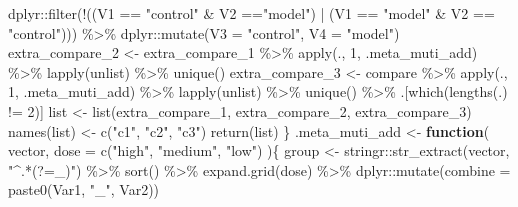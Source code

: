 \documentclass[
]{article}
\newenvironment{Shaded}{\begin{snugshade}}{\end{snugshade}}
\newcommand{\AttributeTok}[1]{\textcolor[rgb]{0.77,0.63,0.00}{#1}}
\newcommand{\ControlFlowTok}[1]{\textcolor[rgb]{0.13,0.29,0.53}{\textbf{#1}}}
\newcommand{\DecValTok}[1]{\textcolor[rgb]{0.00,0.00,0.81}{#1}}
\newcommand{\FunctionTok}[1]{\textcolor[rgb]{0.00,0.00,0.00}{#1}}
\newcommand{\NormalTok}[1]{#1}
\newcommand{\OtherTok}[1]{\textcolor[rgb]{0.56,0.35,0.01}{#1}}
\newcommand{\SpecialCharTok}[1]{\textcolor[rgb]{0.00,0.00,0.00}{#1}}
\newcommand{\StringTok}[1]{\textcolor[rgb]{0.31,0.60,0.02}{#1}}
\begin{document}
\begin{Shaded}
\begin{Highlighting}[]
\NormalTok{      dplyr}\SpecialCharTok{::}\FunctionTok{filter}\NormalTok{(}\SpecialCharTok{!}\NormalTok{((V1 }\SpecialCharTok{==} \StringTok{"control"} \SpecialCharTok{\&}\NormalTok{ V2 }\SpecialCharTok{==}\StringTok{"model"}\NormalTok{) }\SpecialCharTok{|}\NormalTok{ (V1 }\SpecialCharTok{==} \StringTok{"model"} \SpecialCharTok{\&}\NormalTok{ V2 }\SpecialCharTok{==} \StringTok{"control"}\NormalTok{))) }\SpecialCharTok{\%\textgreater{}\%}
\NormalTok{      dplyr}\SpecialCharTok{::}\FunctionTok{mutate}\NormalTok{(}\AttributeTok{V3 =} \StringTok{"control"}\NormalTok{, }\AttributeTok{V4 =} \StringTok{"model"}\NormalTok{)}
\NormalTok{    extra\_compare\_2 }\OtherTok{\textless{}{-}}\NormalTok{ extra\_compare\_1 }\SpecialCharTok{\%\textgreater{}\%}
      \FunctionTok{apply}\NormalTok{(., }\DecValTok{1}\NormalTok{, .meta\_muti\_add) }\SpecialCharTok{\%\textgreater{}\%}
      \FunctionTok{lapply}\NormalTok{(unlist) }\SpecialCharTok{\%\textgreater{}\%}
      \FunctionTok{unique}\NormalTok{()}
\NormalTok{    extra\_compare\_3 }\OtherTok{\textless{}{-}}\NormalTok{ compare }\SpecialCharTok{\%\textgreater{}\%}
      \FunctionTok{apply}\NormalTok{(., }\DecValTok{1}\NormalTok{, .meta\_muti\_add) }\SpecialCharTok{\%\textgreater{}\%}
      \FunctionTok{lapply}\NormalTok{(unlist) }\SpecialCharTok{\%\textgreater{}\%}
      \FunctionTok{unique}\NormalTok{() }\SpecialCharTok{\%\textgreater{}\%}
\NormalTok{      .[}\FunctionTok{which}\NormalTok{(}\FunctionTok{lengths}\NormalTok{(.) }\SpecialCharTok{!=} \DecValTok{2}\NormalTok{)]}
\NormalTok{    list }\OtherTok{\textless{}{-}} \FunctionTok{list}\NormalTok{(extra\_compare\_1, extra\_compare\_2, extra\_compare\_3)}
    \FunctionTok{names}\NormalTok{(list) }\OtherTok{\textless{}{-}} \FunctionTok{c}\NormalTok{(}\StringTok{"c1"}\NormalTok{, }\StringTok{"c2"}\NormalTok{, }\StringTok{"c3"}\NormalTok{)}
    \FunctionTok{return}\NormalTok{(list)}
\NormalTok{  \}}
\NormalTok{.meta\_muti\_add }\OtherTok{\textless{}{-}} 
  \ControlFlowTok{function}\NormalTok{(}
\NormalTok{           vector,}
           \AttributeTok{dose =} \FunctionTok{c}\NormalTok{(}\StringTok{"high"}\NormalTok{, }\StringTok{"medium"}\NormalTok{, }\StringTok{"low"}\NormalTok{)}
\NormalTok{           )\{}
\NormalTok{    group }\OtherTok{\textless{}{-}}\NormalTok{ stringr}\SpecialCharTok{::}\FunctionTok{str\_extract}\NormalTok{(vector, }\StringTok{"\^{}.*(?=\_)"}\NormalTok{) }\SpecialCharTok{\%\textgreater{}\%}
      \FunctionTok{sort}\NormalTok{() }\SpecialCharTok{\%\textgreater{}\%}
      \FunctionTok{expand.grid}\NormalTok{(dose) }\SpecialCharTok{\%\textgreater{}\%}
\NormalTok{      dplyr}\SpecialCharTok{::}\FunctionTok{mutate}\NormalTok{(}\AttributeTok{combine =} \FunctionTok{paste0}\NormalTok{(Var1, }\StringTok{"\_"}\NormalTok{, Var2))}

\end{Highlighting}
\end{Shaded}
\end{document}
